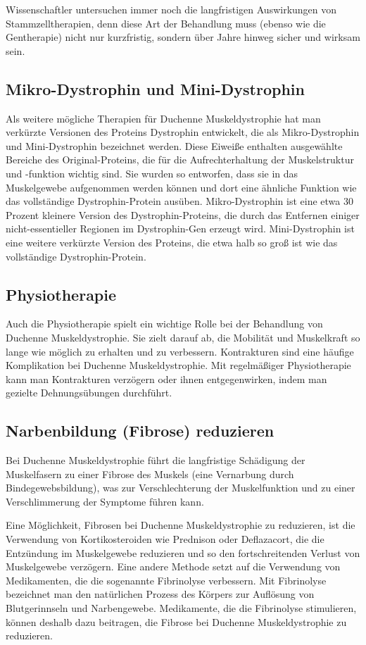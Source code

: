 \documentclass[fontsize=14pt,a4paper,headinclude,DIV=calc,automark]{scrbook}
\begin{document}
Wissenschaftler untersuchen immer noch die langfristigen Auswirkungen von Stammzelltherapien, denn diese Art der Behandlung muss (ebenso wie die Gentherapie) nicht nur kurzfristig, sondern über Jahre hinweg sicher und wirksam sein.

\subsection{Mikro-Dystrophin und Mini-Dystrophin}

Als weitere mögliche Therapien für Duchenne Muskeldystrophie hat man verkürzte Versionen des Proteins Dystrophin entwickelt, die als Mikro-Dystrophin und Mini-Dystrophin bezeichnet werden. Diese Eiweiße enthalten ausgewählte Bereiche des Original-Proteins, die für die Aufrechterhaltung der Muskelstruktur und -funktion wichtig sind. Sie wurden so entworfen, dass sie in das Muskelgewebe aufgenommen werden können und dort eine ähnliche Funktion wie das vollständige Dystrophin-Protein ausüben. Mikro-Dystrophin ist eine etwa 30 Prozent kleinere Version des Dystrophin-Proteins, die durch das Entfernen einiger nicht-essentieller Regionen im Dystrophin-Gen erzeugt wird. Mini-Dystrophin ist eine weitere verkürzte Version des Proteins, die etwa halb so groß ist wie das vollständige Dystrophin-Protein.

\subsection{Physiotherapie}

Auch die Physiotherapie spielt ein wichtige Rolle bei der Behandlung von Duchenne Muskeldystrophie. Sie zielt darauf ab, die Mobilität und Muskelkraft so lange wie möglich zu erhalten und zu verbessern. Kontrakturen sind eine häufige Komplikation bei Duchenne Muskeldystrophie. Mit regelmäßiger Physiotherapie kann man Kontrakturen verzögern oder ihnen entgegenwirken, indem man gezielte Dehnungsübungen durchführt.

\subsection{Narbenbildung (Fibrose) reduzieren}

Bei Duchenne Muskeldystrophie führt die langfristige Schädigung der Muskelfasern zu einer Fibrose des Muskels (eine Vernarbung durch Bindegewebsbildung), was zur Verschlechterung der Muskelfunktion und zu einer Verschlimmerung der Symptome führen kann.

Eine Möglichkeit, Fibrosen bei Duchenne Muskeldystrophie zu reduzieren, ist die Verwendung von Kortikosteroiden wie Prednison oder Deflazacort, die die Entzündung im Muskelgewebe reduzieren und so den fortschreitenden Verlust von Muskelgewebe verzögern. Eine andere Methode setzt auf die Verwendung von Medikamenten, die die sogenannte Fibrinolyse verbessern. Mit Fibrinolyse bezeichnet man den natürlichen Prozess des Körpers zur Auflösung von Blutgerinnseln und Narbengewebe. Medikamente, die die Fibrinolyse stimulieren, können deshalb dazu beitragen, die Fibrose bei Duchenne Muskeldystrophie zu reduzieren.
\end{document}
